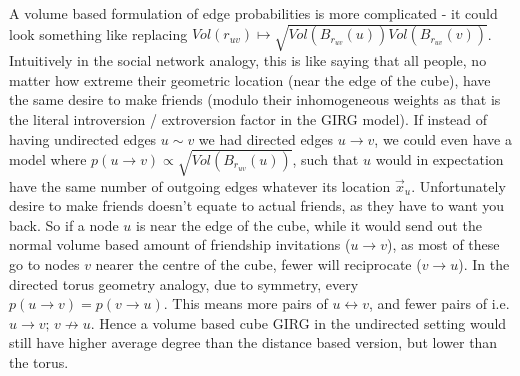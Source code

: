 A volume based formulation of edge probabilities is more complicated - it could look something like replacing $Vol(r_{uv}) \mapsto \sqrt{Vol(B_{r_{uv}}(u)) Vol(B_{r_{uv}}(v))}$.
Intuitively in the social network analogy, this is like saying that all people, no matter how extreme their geometric location (near the edge of the cube), have the same desire to make friends (modulo their inhomogeneous weights as that is the literal introversion / extroversion factor in the GIRG model). 
If instead of having undirected edges $u \sim v$ we had directed edges $u \to v$, we could even have a model where $p(u \to v) \propto \sqrt{Vol(B_{r_{uv}}(u))}$, such that $u$ would in expectation have the same number of outgoing edges whatever its location $\vec{x}_u$.
Unfortunately desire to make friends doesn't equate to actual friends, as they have to want you back.
So if a node $u$ is near the edge of the cube, while it would send out the normal volume based amount of friendship invitations ($u \to v$), as most of these go to nodes $v$ nearer the centre of the cube, fewer will reciprocate ($v \to u$). In the directed torus geometry analogy, due to symmetry, every $p(u \to v) = p(v \to u)$. This means more pairs of $u \leftrightarrow v$, and fewer pairs of  i.e. $u \to v;\, v \not\to u$.
Hence a volume based cube GIRG in the undirected setting would still have higher average degree than the distance based version, but lower than the torus.





